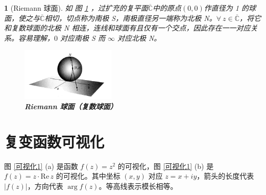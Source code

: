 \documentclass[UTF8]{report}
\def\Re{\mathrm{Re\,}}
\def\C{\mathbb{C}}
\theoremstyle{MyLineTheoremStyle} %
\theoremstyle{MyBlockTheoremStyle} %
\theoremstyle{MySubsubsectionStyle} %
\newtheorem{definition}{}
\begin{document}
\begin{definition}[Riemann 球面]
如 图 \ref{Riemann 球面（复数球面）} ，过扩充的复平面$\overline{\C}$中的原点$(0,0)$作直径为 1 的球面，使之与$\overline{\C}$相切，切点称为南极 S，南极直径另一端称为北极 N。$\forall\ z \in \overline{\C}$，将它和复数球面的北极 N 相连，连线和球面有且仅有一个交点，因此存在一一对应关系。容易理解，$0$ 对应南极 S 而 $\infty$ 对应北极 N。

\begin{figure}[H]\centering
\includegraphics[width=0.40\textwidth]{assets/79ee2f440c28e683147e653d153efc72.png}
\caption{\textbf{Riemann 球面（复数球面）}}\label{Riemann 球面（复数球面）}
\end{figure}
\end{definition}

\section{复变函数可视化}
图 \ref{可视化1} (a) 是函数 $f(z) = z^2$ 的可视化，图 \ref{可视化1} (b) 是 $f(z) = z\cdot \Re z$ 的可视化。其中坐标 $(x,y)$ 对应 $z = x + iy$，箭头的长度代表 $| f(z) |$，方向代表 $\arg f(z)$。等高线表示模长相等。
\end{document}
